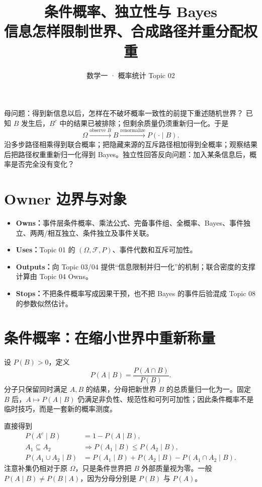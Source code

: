 \documentclass[11pt,a4paper]{ctexart}
\title{\vspace{-1.1cm}\textbf{条件概率、独立性与 Bayes}\\[0.4em]
\large 信息怎样限制世界、合成路径并重分配权重}
\author{数学一 · 概率统计 Topic 02}\date{}
\newcommand{\kw}[1]{\textbf{\color{deep}#1}}
\begin{document}
\maketitle

\begin{corebox}{母问题：得到新信息以后，怎样在不破坏概率一致性的前提下重述随机世界？}
已知 $B$ 发生后，$B^c$ 中的结果已被排除；但剩余质量仍须重新归一化。于是
\[
\boxed{\Omega\xrightarrow{\text{observe }B}B\xrightarrow{\text{renormalize}}P(\cdot\mid B)}.
\]
沿多步路径相乘得到联合概率；把隐藏来源的互斥路径相加得到全概率；观察结果后把路径权重重新归一化得到 Bayes。独立性回答反向问题：加入某条信息后，概率是否完全没有变化？
\end{corebox}

\section{Owner 边界与对象}
\begin{itemize}
\item \kw{Owns：}事件层条件概率、乘法公式、完备事件组、全概率、Bayes、事件独立、两两/相互独立、条件独立及事件关联。
\item \kw{Uses：}Topic 01 的 $(\Omega,\mathcal F,P)$、事件代数和互斥可加性。
\item \kw{Outputs：}向 Topic 03/04 提供“信息限制并归一化”的机制；联合密度的支撑计算由 Topic 04 Owns。
\item \kw{Stops：}不把条件概率写成因果干预，也不把 Bayes 的事件后验混成 Topic 08 的参数似然估计。
\end{itemize}

\section{条件概率：在缩小世界中重新称量}

设 $P(B)>0$，定义
\[
\boxed{P(A\mid B)=\frac{P(A\cap B)}{P(B)}}.
\]
分子只保留同时满足 $A,B$ 的结果，分母把新世界 $B$ 的总质量归一化为一。固定 $B$ 后，$A\mapsto P(A\mid B)$ 仍满足非负性、规范性和可列可加性；因此条件概率不是临时技巧，而是一套新的概率测度。

直接得到
\begin{align*}
P(A^c\mid B)&=1-P(A\mid B),\\
A_1\subseteq A_2&\Longrightarrow P(A_1\mid B)\le P(A_2\mid B),\\
P(A_1\cup A_2\mid B)&=P(A_1\mid B)+P(A_2\mid B)-P(A_1\cap A_2\mid B).
\end{align*}
注意补集仍相对于原 $\Omega$，只是条件世界把 $B$ 外部质量视为零。一般 $P(A\mid B)\ne P(B\mid A)$，因为分母分别是 $P(B)$ 与 $P(A)$。
\end{document}
